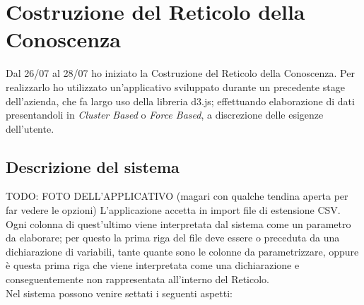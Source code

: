 \section{Costruzione del Reticolo della Conoscenza}
\label{Costruzione del Reticolo della Conoscenza}
Dal 26/07  al 28/07 ho iniziato la Costruzione del Reticolo della Conoscenza. Per realizzarlo ho utilizzato un'applicativo sviluppato durante un precedente stage dell'azienda, che fa largo uso della libreria d3.js; effettuando elaborazione di dati presentandoli in \textit{Cluster Based} o \textit{Force Based}, a discrezione delle esigenze dell'utente.

\subsection{Descrizione del sistema}
\label{Descrizione del sistema}
TODO: FOTO DELL'APPLICATIVO (magari con qualche tendina aperta per far vedere le opzioni)
L'applicazione accetta in import file di estensione CSV. Ogni colonna di quest'ultimo viene interpretata dal sistema come un parametro da elaborare; per questo la prima riga del file deve essere o preceduta da una dichiarazione di variabili, tante quante sono le colonne da parametrizzare, oppure \`e questa prima riga che viene interpretata come una dichiarazione e conseguentemente non rappresentata all'interno del Reticolo.\\
Nel sistema possono venire settati i seguenti aspetti:
